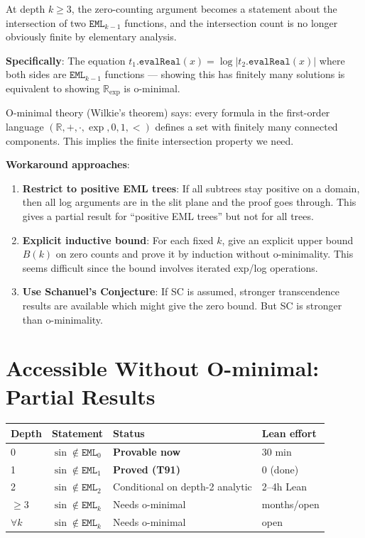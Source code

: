 \documentclass[12pt]{article}
\theoremstyle{definition}
\begin{document}
At depth $k \geq 3$, the zero-counting argument becomes a statement about
the intersection of two $\texttt{EML}_{k-1}$ functions, and the intersection
count is no longer obviously finite by elementary analysis.

\textbf{Specifically}: The equation $t_1.\texttt{evalReal}(x) = \log|t_2.\texttt{evalReal}(x)|$
where both sides are $\texttt{EML}_{k-1}$ functions — showing this has finitely many
solutions is equivalent to showing $\mathbb{R}_{\exp}$ is o-minimal.

O-minimal theory (Wilkie's theorem) says: every formula in the first-order language
$(\mathbb{R}, +, \cdot, \exp, 0, 1, <)$ defines a set with finitely many connected components.
This implies the finite intersection property we need.

\textbf{Workaround approaches}:
\begin{enumerate}
  \item \textbf{Restrict to positive EML trees}: If all subtrees stay positive on a domain,
        then all log arguments are in the slit plane and the proof goes through.
        This gives a partial result for ``positive EML trees'' but not for all trees.
  \item \textbf{Explicit inductive bound}: For each fixed $k$, give an explicit upper bound $B(k)$
        on zero counts and prove it by induction without o-minimality.
        This seems difficult since the bound involves iterated exp/log operations.
  \item \textbf{Use Schanuel's Conjecture}: If SC is assumed, stronger transcendence results
        are available which might give the zero bound.  But SC is stronger than o-minimality.
\end{enumerate}

\section{Accessible Without O-minimal: Partial Results}

\begin{center}
\begin{tabular}{llll}
\toprule
Depth & Statement & Status & Lean effort \\
\midrule
0 & $\sin \notin \texttt{EML}_0$ & \textbf{Provable now} & 30 min \\
1 & $\sin \notin \texttt{EML}_1$ & \textbf{Proved (T91)} & 0 (done) \\
2 & $\sin \notin \texttt{EML}_2$ & Conditional on depth-2 analytic & 2–4h Lean \\
$\geq 3$ & $\sin \notin \texttt{EML}_k$ & Needs o-minimal & months/open \\
\midrule
$\forall k$ & $\sin \notin \texttt{EML}_k$ & Needs o-minimal & open \\
\bottomrule
\end{tabular}
\end{center}
\end{document}
